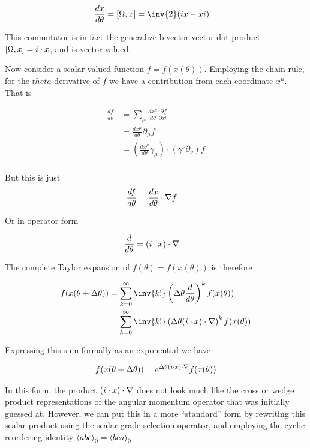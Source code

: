 \begin{align}\label{eqn:rotationGen:foo12}
\frac{dx}{d\theta} &= \antisymmetric{\Omega}{x} = \inv{2} (i x - x i)
\end{align}

This commutator is in fact the generalize bivector-vector dot product $\left[{\Omega},{x}\right] = i \cdot x$, and is vector valued.

Now consider a scalar valued function $f = f(x(\theta))$.  Employing the chain rule, for the $theta$ derivative of $f$ we have a contribution from each coordinate $x^\mu$.  That is

\begin{align*}
\frac{df}{d\theta} 
&= \sum_\mu \frac{d x^\mu}{d \theta} \frac{\partial f}{\partial x^\mu}  \\
&= \frac{d x^\mu}{d \theta} \partial_\mu f \\
&= \left( \frac{d x^\mu}{d \theta} \gamma_\mu \right) \cdot \left( \gamma^\nu \partial_\nu \right)  f \\
\end{align*}

But this is just
\begin{align}\label{eqn:rotationGen:foo13}
\frac{df}{d\theta} &= \frac{d x}{d \theta} \cdot \nabla f
\end{align}

Or in operator form

\begin{align}\label{eqn:rotationGen:foo14}
\frac{d}{d\theta} &= (i \cdot x) \cdot \nabla 
\end{align}

The complete Taylor expansion of $f(\theta) = f(x(\theta))$ is therefore 

\begin{align*}
f(x(\theta + \Delta\theta))
&=
\sum_{k=0}^\infty \inv{k!} \left( \Delta\theta \frac{d}{d\theta} \right)^k 
f(x(\theta)) \\
&=
\sum_{k=0}^\infty \inv{k!} \left( \Delta\theta (i \cdot x) \cdot \grad \right)^k 
f(x(\theta))
\end{align*}

Expressing this sum formally as an exponential we have

\begin{align}\label{eqn:rotationGen:foo20}
f(x(\theta + \Delta\theta)) = e^{\Delta\theta ( i \cdot x) \cdot \nabla} f(x(\theta))
\end{align}

In this form, the product $(i \cdot x) \cdot \nabla$ does not look much like the cross or wedge product representations of the angular momentum operator that was initially guessed at.  However, we can put this in a more ``standard'' form by rewriting this scalar product using the scalar grade selection operator, and employing the cyclic reordering identity ${\left\langle{{ a b c }}\right\rangle}_{0} = {\left\langle{{ b c a}}\right\rangle}_{0}$

